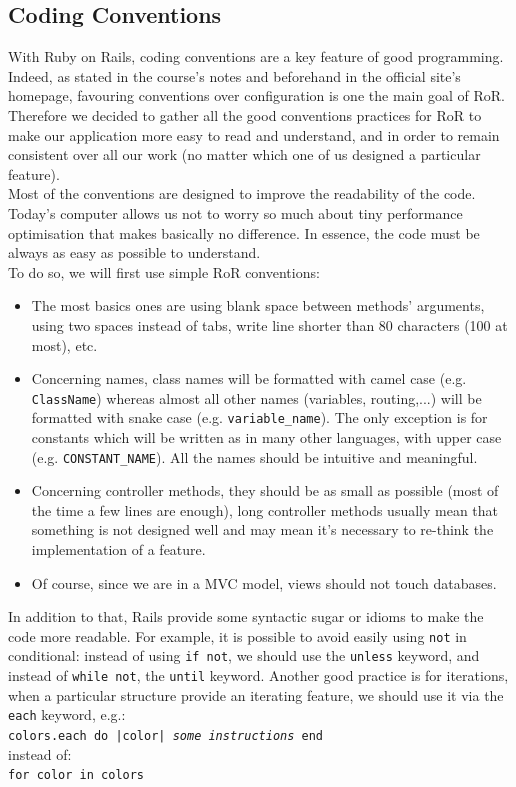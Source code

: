 \subsection{Coding Conventions}
\label{SEC:conventions}
With Ruby on Rails, coding conventions are a key feature of good programming. Indeed, as stated in the course's notes and beforehand in the official site's homepage, favouring conventions over configuration is one the main goal of RoR.\\
Therefore we decided to gather all the good conventions practices for RoR to make our application more easy to read and understand, and in order to remain consistent over all our work (no matter which one of us designed a particular feature).\\

Most of the conventions are designed to improve the readability of the code. Today's computer allows us not to worry so much about tiny performance optimisation that makes basically no difference. In essence, the code must be always as easy as possible to understand.\\

To do so, we will first use simple RoR conventions:
\begin{itemize}
	\item The most basics ones are using blank space between methods' arguments, using two spaces instead of tabs, write line shorter than 80 characters (100 at most), etc.
    \item Concerning names, class names will be formatted with camel case (e.g. \texttt{ClassName}) whereas almost all other names (variables, routing,...) will be formatted with snake case (e.g. \texttt{variable\_name}). The only exception is for constants which will be written as in many other languages, with upper case (e.g. \texttt{CONSTANT\_NAME}). All the names should be intuitive and meaningful.
    \item Concerning controller methods, they should be as small as possible (most of the time a few lines are enough), long controller methods usually mean that something is not designed well and may mean it's necessary to re-think the implementation of a feature.
	\item Of course, since we are in a MVC model, views should not touch databases.
\end{itemize}

In addition to that, Rails provide some syntactic sugar or idioms to make the code more readable. For example, it is possible to avoid easily using \texttt{not} in conditional: instead of using \texttt{if not}, we should use the \texttt{unless} keyword, and instead of \texttt{while not}, the \texttt{until} keyword. Another good practice is for iterations, when a particular structure provide an iterating feature, we should use it via the \texttt{each} keyword, e.g.:\\
\indent\texttt{colors.each do |color| \textit{some instructions} end}\\ instead of:\\
\indent\texttt{for color in colors}\\

